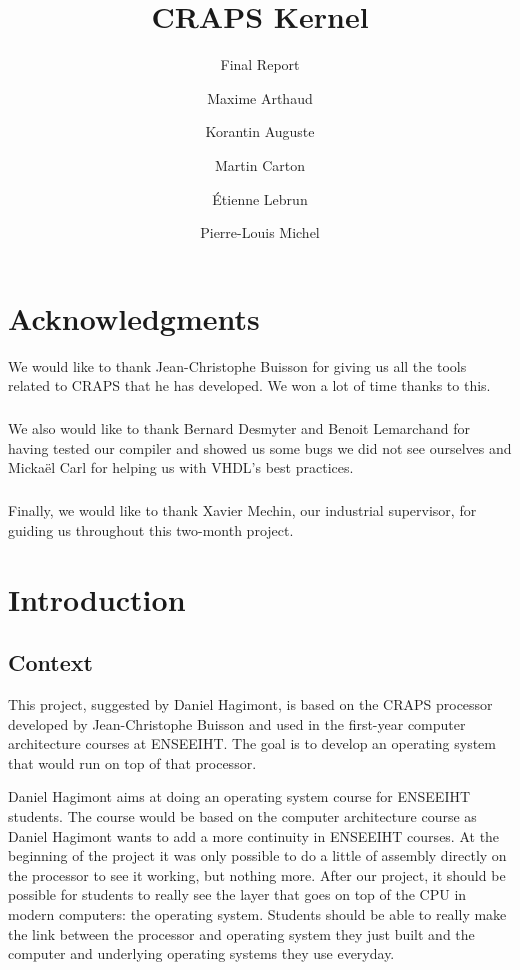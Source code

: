 \documentclass[openany, a4paper]{book}
\title{CRAPS Kernel}
\subtitle{Final Report}
\author{
       Maxime Arthaud
  \and Korantin Auguste
  \and Martin Carton
  \and Étienne Lebrun
  \and Pierre-Louis Michel
}
\begin{document}
  

  \chapter*{Acknowledgments}
    We would like to thank Jean-Christophe Buisson for giving us all the tools
    related to CRAPS that he has developed. We won a lot of time thanks to this.

    \paragraph{}
    We also would like to thank Bernard Desmyter and Benoit Lemarchand for
    having tested our compiler and showed us some bugs we did not see ourselves
    and Mickaël Carl for helping us with VHDL's best practices.

    \paragraph{}
    Finally, we would like to thank Xavier Mechin, our industrial supervisor,
    for guiding us throughout this two-month project.

  \tableofcontents

  \chapter{Introduction}

    \section{Context}
      This project, suggested by Daniel Hagimont, is based on the CRAPS
      processor developed by Jean-Christophe Buisson and used in the first-year
      computer architecture courses at ENSEEIHT. The goal is to develop an
      operating system that would run on top of that processor.

      Daniel Hagimont aims at doing an operating system course for ENSEEIHT
      students. The course would be based on the computer architecture course as
      Daniel Hagimont wants to add a more continuity in ENSEEIHT courses. At the
      beginning of the project it was only possible to do a little of assembly
      directly on the processor to see it working, but nothing more.
      After our project, it should be possible for students to really see
      the layer that goes on top of the CPU in modern computers: the operating
      system. Students should be able to really make the link between the
      processor and operating system they just built and the computer and
      underlying operating systems they use everyday.
\end{document}
